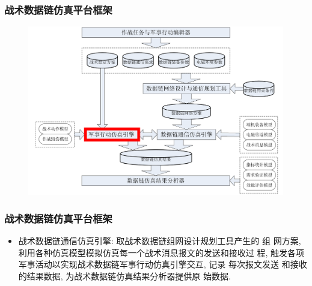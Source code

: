 \documentclass[10pt,mathserif]{beamer}%
\begin{document}
\begin{frame}[fragile]
	\frametitle{战术数据链仿真平台框架}
	\setlength{\parindent}{2em}
	\begin{spacing}{1.5}
		\begin{figure}[htb]
			\centering
			\includegraphics[width=1\linewidth]{./images/arch3.png}
		\end{figure}
	\end{spacing}
\end{frame} 

\begin{frame}[fragile]
	\frametitle{战术数据链仿真平台框架}
	\begin{spacing}{1.5}
		\begin{itemize}
			\item 战术数据链通信仿真引擎: 取战术数据链组网设计规划工具产生的 组
				网方案, 利用各种仿真模型模拟仿真每一个战术消息报文的发送和接收过
				程,  触发各项军事活动以实现战术数据链军事行动仿真引擎交互, 记录
				每次报文发送 和接收的结果数据, 为战术数据链仿真结果分析器提供原
				始数据. 
		\end{itemize}
	\end{spacing}
\end{frame}
\end{document}
